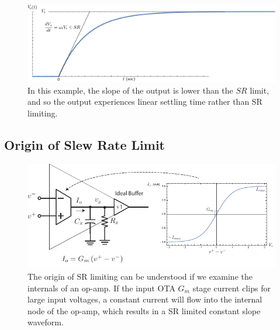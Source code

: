 \begin{figure}[tb]
\begin{center}
\includegraphics[width=.8\columnwidth]{SR_case2}
\end{center}
\caption{In this example, the slope of the output is lower than the $SR$ limit, and so the output experiences linear settling time rather than SR limiting.} \label{fig:SR_case2}
\end{figure}


 


\subsection{Origin of Slew Rate Limit}



\begin{figure}[tb]
\begin{center}
\includegraphics[width=\columnwidth]{opamp_ota_SR}
\end{center}
\caption{The origin of SR limiting can be understood if we examine the internals of an op-amp. If the input OTA $G_m$ stage current clips for large input voltages, a constant current will flow into the internal node of the op-amp, which results in a SR limited constant slope waveform.} \label{fig:opamp_ota_SR}
\end{figure}


